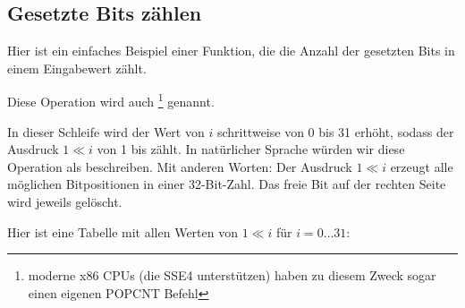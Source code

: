 \subsection{Gesetzte Bits zählen}
Hier ist ein einfaches Beispiel einer Funktion, die die Anzahl der gesetzten
Bits in einem Eingabewert zählt.

Diese Operation wird auch \footnote{moderne x86 CPUs
(die SSE4 unterstützen) haben zu diesem Zweck sogar einen eigenen POPCNT Befehl}
genannt.


In dieser Schleife wird der Wert von $i$ schrittweise von 0 bis 31 erhöht,
sodass der Ausdruck $1 \ll i$ von 1 bis  zählt.
In natürlicher Sprache würden wir diese Operation als  beschreiben.
Mit anderen Worten: Der Ausdruck $1 \ll i$ erzeugt alle möglichen Bitpositionen
in einer 32-Bit-Zahl.
Das freie Bit auf der rechten Seite wird jeweils gelöscht.

\label{2n_numbers_table}
Hier ist eine Tabelle mit allen Werten von $1 \ll i$ 
für $i=0 \ldots 31$:


